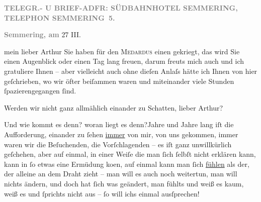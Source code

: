 \pstart
           \centering{}\textcolor{gray}{\textbf{TELEGR.- U BRIEF-ADFR: SÜDBAHNHOTEL SEMMERING, TELEPHON SEMMERING 5.}}\pend
           
\pstart
           \raggedleft{}\textcolor{gray}{\textbf{Semmering, am}}{ }27 III.\pend
           
\pstart{}mein lieber Arthur\pend\vspace{0.5em}
\pstart
           Sie haben für den \textsc{Medardus} einen \label{K_L02167-1v}\label{K_L02167-1} gekriegt, das wird Sie einen Augenblick oder einen Tag lang
               freuen, darum freuts mich auch und ich gratuliere Ihnen – aber vielleicht auch ohne
               dieſen Anlaſs {\pb}hätte ich Ihnen von
               hier geſchrieben, wo wir öfter beiſammen waren und miteinander viele Stunden{ }ſpazierengegangen{ }ſind.\pend
           
\pstart
           Werden wir nicht ganz allmählich einander zu Schatten, lieber Arthur?\pend
           
\pstart
           Und wie kommt es denn? woran liegt es denn?\hspace*{1.5em}Jahre
               und Jahre lang iſt die Aufforderung, einander zu{ }ſehen \uline{immer} von mir, von uns gekommen, immer waren wir die Beſuchenden, die
               Vorſchlagenden – es iſt ganz unwillkürlich {\pb}geſchehen, aber auf einmal, in
               einer Weiſe die man{ }ſich{ }ſelbſt nicht erklären kann, kann in{ }ſo etwas eine Ermüdung
                  ko{\geminationm}en, auf einmal kann man{ }ſich \uline{fühlen} als der, der alleine an dem Draht zieht – man will es
               auch noch weitertun, man will nichts ändern, und doch hat{ }ſich was geändert, man
               fühlts und weiß es kaum, weiß es und{ }ſprichts nicht aus – {\pb}ſo will ichs einmal
               ausſprechen!\pend
           
